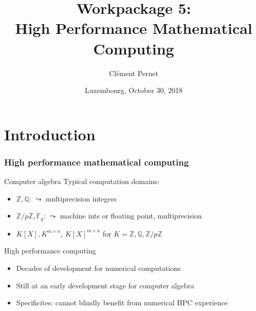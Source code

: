 \documentclass{beamer}
\title[Workpackage 5]{Workpackage 5:\\ High Performance Mathematical Computing}
\author[2nd projet review]{Clément Pernet}
\date{Luxembourg, October 30, 2018}
\institute[ODK Project review]{Second OpenDreamKit Project review}
\begin{document}
\maketitle

\section*{Introduction}

\begin{frame}
  \frametitle{High performance mathematical computing}

  \begin{block}{Computer algebra}
    Typical computation domains:
    \begin{itemize}
    \item $\mathbb{Z}, \mathbb{Q}$: $\leadsto$ multiprecision integers
    \item $\mathbb{Z}/p\mathbb{Z}, \mathbb{F}_q$: $\leadsto$ machine ints or
      floating point, multiprecision
    \item $K[X], K^{m\times n}$, $K[X]^{m\times n}$ for $K=\mathbb{Z},\mathbb{Q},\mathbb{Z}/p\mathbb{Z}$
    \end{itemize}
  \end{block}

  \begin{block} {High performance computing}
    \begin{itemize}
    \item Decades of development for numerical computations
    \item Still at an early development stage for computer algebra
    \item Specificites: cannot blindly benefit from numerical HPC experience
    \end{itemize}
  \end{block}
\end{frame}
\end{document}

